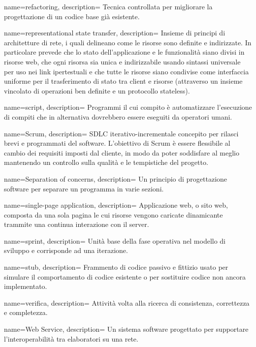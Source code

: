  {
name=refactoring,
description={
Tecnica controllata per migliorare la progettazione di un codice base già
esistente.
}
}

 {
name=representational state transfer,
description={
Insieme di principi di architetture di rete, i quali delineano come le risorse
sono definite e indirizzate. In particolare prevede che lo stato
dell’applicazione e le funzionalità siano divisi in risorse web, che ogni
risorsa sia unica e indirizzabile usando sintassi universale per uso nei link
ipertestuali e che tutte le risorse siano condivise come interfaccia uniforme
per il trasferimento di stato tra client e risorse (attraverso un insieme
vincolato di operazioni ben definite e un protocollo stateless).
}
}

 {
name=script,
description={
Programmi il cui compito è automatizzare l'esecuzione di compiti che in
alternativa dovrebbero essere eseguiti da operatori umani.
}
}

 {
name=Scrum,
description={
SDLC iterativo-incrementale concepito per rilasci brevi e programmati del
software. L'obiettivo di Scrum è essere flessibile al cambio dei requisiti
imposti dal cliente, in modo da poter soddisfare al meglio mantenendo un
controllo sulla qualità e le tempistiche del progetto.
}
}

 {
name=Separation of concerns,
description={
Un principio di progettazione software per separare un programma in varie
sezioni.
}
}

 {
name=single-page application,
description={
Applicazione web, o sito web, composta da una sola pagina le cui risorse vengono
caricate dinamicante trammite una continua interazione con il server.
}
}

 {
name=sprint,
description={
Unità base della fase operativa nel modello di sviluppo  e
corrisponde ad una iterazione.
}
}

 {
name=stub,
description={
Frammento di codice passivo e fittizio usato per simulare il comportamento di
codice esistente o per sostituire codice non ancora implementato.
}
}

 {
name=verifica,
description={
Attività volta alla ricerca di consistenza, correttezza e completezza.
}
}

 {
name=Web Service,
description={
Un sistema software progettato per supportare l'interoperabilità tra elaboratori
su una rete.
}
}


